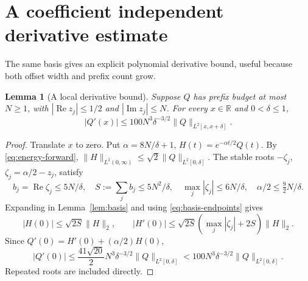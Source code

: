 \documentclass[11pt]{article}
\newtheorem{lemma}[theorem]{Lemma}
\theoremstyle{remark}
\newcommand{\R}{\mathbb R}
\newcommand{\norm}[1]{\lVert #1\rVert}
\newcommand{\Rea}{\operatorname{Re}}
\newcommand{\Ima}{\operatorname{Im}}
\begin{document}
\section{A coefficient independent derivative estimate}
The same basis gives an explicit polynomial derivative bound, useful
because both offset width and prefix count grow.
\begin{lemma}[A local derivative bound]\label{lem:local-derivative}
Suppose $Q$ has prefix budget at most $N\ge1$, with
$|\Rea z_j|\le1/2$ and $|\Ima z_j|\le N$.
For every $x\in\R$ and $0<\delta\le1$,
\begin{equation}\label{eq:local-derivative}
 |Q'(x)|\le100N^3\delta^{-3/2}
                           \norm Q_{L^2[x,x+\delta]}.
\end{equation}
\end{lemma}
\begin{proof}
Translate $x$ to zero. Put $\alpha=8N/\delta+1$,
$H(t)=e^{-\alpha t/2}Q(t)$.
By \eqref{eq:energy-forward},
$\norm H_{L^2(0,\infty)}\le\sqrt2\norm Q_{L^2[0,\delta]}$.
The stable roots $-\zeta_j$, $\zeta_j=\alpha/2-z_j$, satisfy
\[
 b_j=\Rea\zeta_j\le5N/\delta,\quad
 S:=\sum_jb_j\le5N^2/\delta,\quad
 \max_j|\zeta_j|\le6N/\delta,\quad \alpha/2\le\tfrac92N/\delta.
\]
Expanding in Lemma~\ref{lem:basis} and using \eqref{eq:basis-endpoints} gives
\[
 |H(0)|\le\sqrt{2S}\norm H_2,\qquad
 |H'(0)|\le\sqrt{2S}(\max_j|\zeta_j|+2S)\norm H_2.
\]
Since $Q'(0)=H'(0)+(\alpha/2)H(0)$,
\[
 |Q'(0)|\le\frac{41\sqrt{20}}2N^3\delta^{-3/2}
                   \norm Q_{L^2[0,\delta]}
          <100N^3\delta^{-3/2}\norm Q_{L^2[0,\delta]}.
\]
Repeated roots are included directly.
\end{proof}
\end{document}

